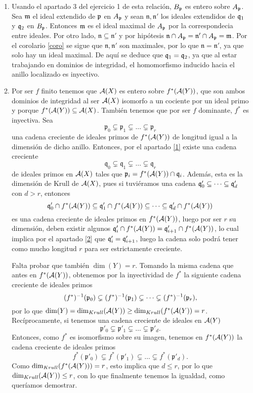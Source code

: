 \documentclass[twoside]{article}
\begin{document}
\begin{solucion}
\begin{enumerate}
\item  Usando el apartado 3 del ejercicio 1 de esta relación, $B_{\mathfrak{p}}$ es entero sobre $A_{\mathfrak{p}}$. Sea $\mathfrak{m}$ el ideal extendido de $\mathfrak{p}$ en $A_{\mathfrak{p}}$ y sean $\mathfrak{n},\mathfrak{n}'$ los ideales extendidos de $\mathfrak{q}_1$ y $\mathfrak{q}_2$ en $B_{\mathfrak{p}}$. Entonces $\mathfrak{m}$ es el ideal maximal de $A_{\mathfrak{p}}$ por la correspondecia entre ideales. Por otro lado, $\mathfrak{n}\subseteq\mathfrak{n}'$ y por hipótesis $\mathfrak{n}\cap A_{\mathfrak{p}}=\mathfrak{n}'\cap A_{\mathfrak{p}}=\mathfrak{m}$. Por el corolario \ref{coro} se sigue que $\mathfrak{n},\mathfrak{n}'$ son maximales, por lo que $\mathfrak{n}=\mathfrak{n}'$, ya que solo hay un ideal maximal. De aquí se deduce que $\mathfrak{q}_1=\mathfrak{q}_2$, ya que al estar trabajando en dominios de integridad, el homomorfismo inducido hacia el anillo localizado es inyectivo.


\item Por ser $f$ finito tenemos que $\mathcal{A}(X)$ es entero sobre $f^*(\mathcal{A}(Y))$, que son ambos dominios de integridad al ser $\mathcal{A}(X)$ isomorfo a un cociente por un ideal primo y porque $f^*(\mathcal{A}(Y))\subseteq\mathcal{A}(X)$. También tenemos que por ser $f$ dominante, $f^*$ es inyectiva. Sea 
$$\mathfrak{p}_0 \subsetneq \mathfrak{p}_1 \subsetneq \dots \subsetneq \mathfrak{p}_r$$ 
una cadena creciente de ideales primos de $f^*(\mathcal{A}(Y))$ de longitud igual a la dimensión de dicho anillo. Entonces, por el apartado \ref{1} existe una cadena creciente
$$\mathfrak{q}_0 \subsetneq \mathfrak{q}_1 \subsetneq \dots \subsetneq \mathfrak{q}_r$$ 
de ideales primos en $\mathcal{A}(X)$ tales que $\mathfrak{p}_i = f^*(\mathcal{A}(Y)) \cap \mathfrak{q}_i$. Además, esta es la dimensión de Krull de $\mathcal{A}(X)$, pues si tuviéramos una cadena $\mathfrak{q}'_0\subseteq\dots\subseteq \mathfrak{q}'_d$ con $d>r$, entonces 
$$\mathfrak{q}'_0\cap f^*(\mathcal{A}(Y))\subseteq \mathfrak{q}'_1\cap f^*(\mathcal{A}(Y))\subseteq\dots\subseteq \mathfrak{q}'_d\cap f^*(\mathcal{A}(Y))$$ 
es una cadena creciente de ideales primos en $f^*(\mathcal{A}(Y))$, luego por ser $r$ su dimensión, deben existir algunos $\mathfrak{q}'_i\cap f^*(\mathcal{A}(Y))=\mathfrak{q}'_{i+1}\cap f^*(\mathcal{A}(Y))$, lo cual implica por el apartado \ref{2} que $\mathfrak{q}'_i=\mathfrak{q}'_{i+1}$, luego la cadena solo podrá tener como mucho longitud $r$ para ser estrictamente creciente. 

Falta probar que también $\dim(Y)=r$. Tomando la misma cadena que antes en $f^*(\mathcal{A}(Y))$, obtenemos por la inyectividad de $f^*$ la siguiente cadena creciente de ideales primos
$$(f^*)^{-1}(\mathfrak{p}_0)\subsetneq (f^*)^{-1}(\mathfrak{p}_1)\subsetneq\dots\subsetneq (f^*)^{-1}(\mathfrak{p}_r),$$
por lo que $\dim(Y)=\dim_{Krull}(\mathcal{A}(Y))\geq\dim_{Krull}(f^*(\mathcal{A}(Y))=r$. Recíprocamente, si tenemos una cadena creciente de ideales en $\mathcal{A}(Y)$
$$\mathfrak{p}'_0 \subsetneq \mathfrak{p}'_1 \subsetneq \dots \subsetneq \mathfrak{p}'_d.$$
Entonces, como $f^*$ es isomorfismo sobre su imagen, tenemos en $f^*(\mathcal{A}(Y))$ la cadena creciente de ideales primos
$$f^*(\mathfrak{p}'_0) \subsetneq f^*(\mathfrak{p}'_1) \subsetneq \dots \subsetneq f^*(\mathfrak{p}'_d).$$
Como $\dim_{Krull}(f^*(\mathcal{A}(Y)))=r$, esto implica que $d\leq r$, por lo que $\dim_{Krull}(\mathcal{A}(Y))\leq r$, con lo que finalmente tenemos la igualdad, como queríamos demostrar.

\end{enumerate}
\end{solucion}

\newpage
\end{document}
